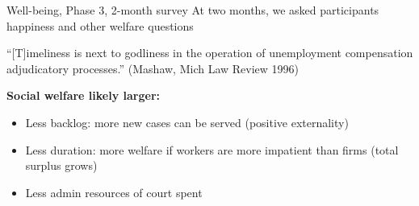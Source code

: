 \documentclass[9pt]{beamer}
\begin{document}






 
 



 \begin{frame}{Well-being, Phase 3, 2-month survey}
 At two months, we asked participants happiness and other welfare questions
    \begin{table}[H]
    \label{calc_template}
    \begin{center}
        \scriptsize{}
        \end{center}
\end{table}
\vspace{4mm}
``[T]imeliness is next to godliness in the operation of unemployment compensation adjudicatory processes.'' (Mashaw, Mich Law Review 1996)

\vspace{4mm}
\textbf{Social welfare likely larger:}
\begin{itemize}
    \item \alert{Less backlog:} more new cases can be served (positive externality)
    \item \alert{Less duration:} more welfare if workers are more impatient than firms (total surplus grows)
    \item \alert{Less admin resources} of court spent
\end{itemize}

 \end{frame}



\end{document}
